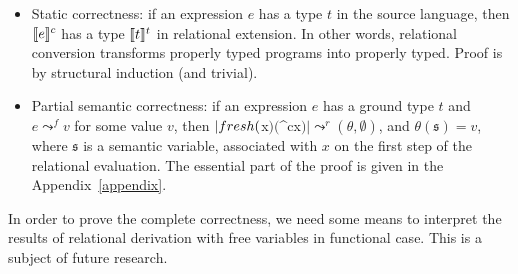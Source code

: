 \begin{itemize}
\item Static correctness: if an expression $e$ has a type $t$ in the source language, then $\llbracket{e}\rrbracket^c$ has a 
type $\llbracket{t}\rrbracket^t$ in relational extension. In other words, relational conversion transforms properly typed
programs into properly typed. Proof is by structural induction (and trivial).
\item Partial semantic correctness: if an expression $e$ has a ground type $t$ and \mbox{$e \leadsto^f v$} for some
  value $v$, then \mbox{$\lstinline|fresh($x$)($^c\;x$)| \leadsto^r (\theta,\emptyset)$}, and 
\mbox{$\theta(\mathfrak{s})=v$}, where $\mathfrak{s}$ is a semantic variable, associated with $x$ on the
first step of the relational evaluation.
  The essential part of the proof is given in the Appendix~\ref{appendix}.
\end{itemize}

In order to prove the complete correctness, we need some means to interpret the results of relational 
derivation with free variables in functional case. This is a subject of future research.
